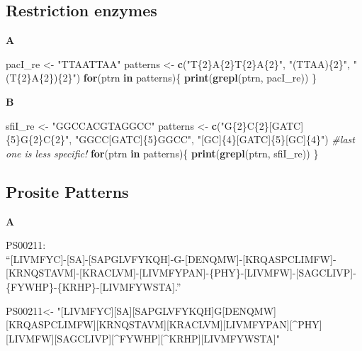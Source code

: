 \documentclass[]{book}
\newenvironment{Shaded}{\begin{snugshade}}{\end{snugshade}}
\newcommand{\CommentTok}[1]{\textcolor[rgb]{0.56,0.35,0.01}{\textit{#1}}}
\newcommand{\ControlFlowTok}[1]{\textcolor[rgb]{0.13,0.29,0.53}{\textbf{#1}}}
\newcommand{\KeywordTok}[1]{\textcolor[rgb]{0.13,0.29,0.53}{\textbf{#1}}}
\newcommand{\NormalTok}[1]{#1}
\newcommand{\StringTok}[1]{\textcolor[rgb]{0.31,0.60,0.02}{#1}}
\begin{document}
\hypertarget{restriction-enzymes-1}{%
\subsection{Restriction enzymes}\label{restriction-enzymes-1}}

\textbf{A}

\begin{Shaded}
\begin{Highlighting}[]
\NormalTok{pacI_re <-}\StringTok{ "TTAATTAA"}
\NormalTok{patterns <-}\StringTok{ }\KeywordTok{c}\NormalTok{(}\StringTok{"T\{2\}A\{2\}T\{2\}A\{2\}"}\NormalTok{,}
           \StringTok{"(TTAA)\{2\}"}\NormalTok{, }
           \StringTok{"(T\{2\}A\{2\})\{2\}"}\NormalTok{)}
\ControlFlowTok{for}\NormalTok{(ptrn }\ControlFlowTok{in}\NormalTok{ patterns)\{}
    \KeywordTok{print}\NormalTok{(}\KeywordTok{grepl}\NormalTok{(ptrn, pacI_re))}
\NormalTok{\}}
\end{Highlighting}
\end{Shaded}

\textbf{B}

\begin{Shaded}
\begin{Highlighting}[]
\NormalTok{sfiI_re <-}\StringTok{ "GGCCACGTAGGCC"}
\NormalTok{patterns <-}\StringTok{ }\KeywordTok{c}\NormalTok{(}\StringTok{"G\{2\}C\{2\}[GATC]\{5\}G\{2\}C\{2\}"}\NormalTok{,}
           \StringTok{"GGCC[GATC]\{5\}GGCC"}\NormalTok{, }
           \StringTok{"[GC]\{4\}[GATC]\{5\}[GC]\{4\}"}\NormalTok{) }\CommentTok{#last one is less specific!}
\ControlFlowTok{for}\NormalTok{(ptrn }\ControlFlowTok{in}\NormalTok{ patterns)\{}
    \KeywordTok{print}\NormalTok{(}\KeywordTok{grepl}\NormalTok{(ptrn, sfiI_re))}
\NormalTok{\}}
\end{Highlighting}
\end{Shaded}

\hypertarget{prosite-patterns-1}{%
\subsection{Prosite Patterns}\label{prosite-patterns-1}}

\textbf{A}

PS00211:\\
``{[}LIVMFYC{]}-{[}SA{]}-{[}SAPGLVFYKQH{]}-G-{[}DENQMW{]}-{[}KRQASPCLIMFW{]}-{[}KRNQSTAVM{]}-{[}KRACLVM{]}-{[}LIVMFYPAN{]}-\{PHY\}-{[}LIVMFW{]}-{[}SAGCLIVP{]}-\{FYWHP\}-\{KRHP\}-{[}LIVMFYWSTA{]}.''

\begin{Shaded}
\begin{Highlighting}[]
\NormalTok{PS00211<-}\StringTok{ "[LIVMFYC][SA][SAPGLVFYKQH]G[DENQMW][KRQASPCLIMFW][KRNQSTAVM][KRACLVM][LIVMFYPAN][^PHY][LIVMFW][SAGCLIVP][^FYWHP][^KRHP][LIVMFYWSTA]"}
\end{Highlighting}
\end{Shaded}
\end{document}
